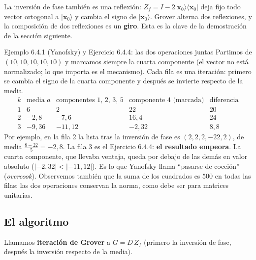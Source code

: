 \documentclass[11pt, a4paper, twoside, openright]{report}
\providecommand{\ket}[1]{|#1\rangle}
\providecommand{\bra}[1]{\langle #1|}
\newcommand{\bx}{\mathbf{x}}
\begin{document}
\noindent La inversión de fase también es una reflexión: $Z_f = I - 2\ket{\bx_0}\bra{\bx_0}$ deja fijo todo vector ortogonal a $\ket{\bx_0}$ y cambia el signo de $\ket{\bx_0}$. Grover alterna dos reflexiones, y la composición de dos reflexiones es un \textbf{giro}. Esta es la clave de la demostración de la sección siguiente.

\begin{ejemplo}{Ejemplo 6.4.1 (Yanofsky) y Ejercicio 6.4.4: las dos operaciones juntas}
Partimos de $(10, 10, 10, 10, 10)$ y marcamos siempre la cuarta componente (el vector no está normalizado; lo que importa es el mecanismo). Cada fila es una iteración: primero se cambia el signo de la cuarta componente y después se invierte respecto de la media.
\[
\renewcommand{\arraystretch}{1.25}
\begin{array}{c|c|c|c|c}
k & \text{media } a & \text{componentes 1, 2, 3, 5} & \text{componente 4 (marcada)} & \text{diferencia} \\ \hline
1 & 6 & 2 & 22 & 20 \\
2 & -2{,}8 & -7{,}6 & 16{,}4 & 24 \\
3 & -9{,}36 & -11{,}12 & -2{,}32 & 8{,}8
\end{array}
\]
Por ejemplo, en la fila 2 la lista tras la inversión de fase es $(2, 2, 2, -22, 2)$, de media $\frac{8-22}{5} = -2{,}8$. La fila 3 es el Ejercicio 6.4.4: \textbf{el resultado empeora}. La cuarta componente, que llevaba ventaja, queda por debajo de las demás en valor absoluto ($|-2{,}32| < |-11{,}12|$). Es lo que Yanofsky llama ``pasarse de cocción'' (\textit{overcook}). Observemos también que la suma de los cuadrados es $500$ en todas las filas: las dos operaciones conservan la norma, como debe ser para matrices unitarias.
\end{ejemplo}

\subsection{El algoritmo}

\noindent Llamamos \textbf{iteración de Grover} a $G = D\,Z_f$ (primero la inversión de fase, después la inversión respecto de la media).
\end{document}
